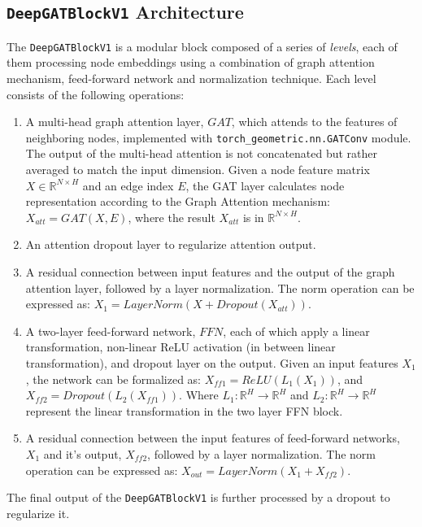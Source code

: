 \documentclass{article}
\begin{document}
	\subsection*{\texttt{DeepGATBlockV1} Architecture}
	
	The \texttt{DeepGATBlockV1} is a modular block composed of a series of \textit{levels}, each of them processing node embeddings using a combination of graph attention mechanism, feed-forward network and normalization technique.
	Each level consists of the following operations:
	\begin{enumerate}
		\item A multi-head graph attention layer, $GAT$, which attends to the features of neighboring nodes, implemented with \texttt{torch\_geometric.nn.GATConv} module.
		The output of the multi-head attention is not concatenated but rather averaged to match the input dimension.
		Given a node feature matrix $X \in \mathbb{R}^{N \times H}$ and an edge index $E$, the GAT layer calculates node representation according to the Graph Attention mechanism: $X_{att} = GAT(X, E)$, where the result $X_{att}$ is in $\mathbb{R}^{N \times H}$.
		\item An attention dropout layer to regularize attention output.
		\item A residual connection between input features and the output of the graph attention layer, followed by a layer normalization. The norm operation can be expressed as: $X_1 = LayerNorm(X + Dropout(X_{att}))$.
		\item A two-layer feed-forward network, $FFN$, each of which apply a linear transformation, non-linear ReLU activation (in between linear transformation), and dropout layer on the output. Given an input features $X_1$, the network can be formalized as: $X_{ff1} =  ReLU(L_1(X_1))$, and $X_{ff2} = Dropout(L_2(X_{ff1}))$. Where $L_1 : \mathbb{R}^{H} \to \mathbb{R}^{H}$ and $L_2 : \mathbb{R}^{H} \to \mathbb{R}^{H}$ represent the linear transformation in the two layer FFN block.
		\item A residual connection between the input features of feed-forward networks, $X_1$ and it's output, $X_{ff2}$, followed by a layer normalization. The norm operation can be expressed as: $X_{out} = LayerNorm(X_1 + X_{ff2})$.
	\end{enumerate}
	The final output of the \texttt{DeepGATBlockV1} is further processed by a dropout to regularize it.
\end{document}
